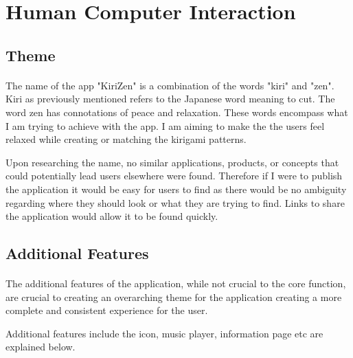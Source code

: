 \documentclass[11pt]{article}
\begin{document}
\clearpage
\newpage
\section{Human Computer Interaction}
    \paragraph{}

    
    \subsection{Theme}
        
        \paragraph{}
        The name of the app "KiriZen" is a combination of the words "kiri" and "zen". Kiri as previously mentioned refers to the Japanese word meaning to cut. The word zen has connotations of peace and relaxation. These words encompass what I am trying to achieve with the app. I am aiming to make the the users feel relaxed while creating or matching the kirigami patterns.
        
        Upon researching the name, no similar applications, products, or concepts that could potentially lead users elsewhere were found. Therefore if I were to publish the application it would be easy for users to find as there would be no ambiguity regarding where they should look or what they are trying to find. Links to share the application would allow it to be found quickly. 

        \subsection{Additional Features}
            \paragraph{}
        The additional features of the application, while not crucial to the core function, are crucial to creating an overarching theme for the application creating a more complete and consistent experience for the user.
        


Additional features include the icon, music player, information page etc are explained below. 
        
\end{document}
